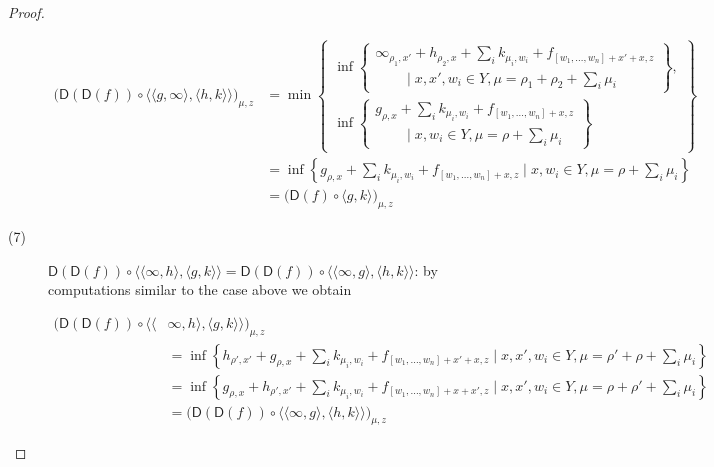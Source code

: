 \begin{proof}
\begin{description}
{
\small
\begin{align*}
\Big(\mathsf D(\mathsf D(f))\circ \langle \langle g,\infty\rangle,\langle h,k\rangle\rangle\Big)_{\mu,z}&=
\min\left\{
\begin{matrix}
\inf\left\{
\begin{matrix}
\infty_{\rho_{1},x'} + h_{\rho_{2},x}+ \sum_{i}k_{\mu_{i},w_{i}}
+
f_{[w_{1},\dots, w_{n}]+x'+x,z}\\
\qquad \mid 
x,x',w_{i}\in Y, 
\mu=\rho_{1}+\rho_{2}+\sum_{i}\mu_{i}
\end{matrix}
\right\},\\
\inf\left\{
\begin{matrix}
g_{\rho,x}+ \sum_{i}k_{\mu_{i},w_{i}}
+f_{[w_{1},\dots, w_{n}]+x,z}\\
\qquad \mid 
x,w_{i}\in Y, 
\mu=\rho+\sum_{i}\mu_{i}
\end{matrix}
\right\}
\end{matrix}
\right\}\\
&=
\inf\left\{
g_{\rho,x}+ \sum_{i}k_{\mu_{i},w_{i}}
+f_{[w_{1},\dots, w_{n}]+x,z}
\mid 
x,w_{i}\in Y, 
\mu=\rho+\sum_{i}\mu_{i}
\right\}\\
&= \Big(\mathsf D(f)\circ \langle g,k\rangle\Big)_{\mu,z}
\end{align*}
}

\item[(7)] $\mathsf D(\mathsf D(f))\circ \langle\langle \infty,h\rangle, \langle g,k\rangle\rangle= \mathsf D(\mathsf D(f))\circ \langle \langle \infty,g\rangle, \langle h,k\rangle\rangle$:
by computations similar to the case above we obtain

{
\small
\begin{align*}
\Big(\mathsf D(\mathsf D(f))\circ \langle \langle & \infty,h\rangle,\langle g,k\rangle\rangle\Big)_{\mu,z}\\
&=
\inf\left\{
h_{\rho',x'} + g_{\rho,x}+ \sum_{i}k_{\mu_{i},w_{i}}
+
f_{[w_{1},\dots, w_{n}]+x'+x,z}
\mid 
x,x',w_{i}\in Y, 
\mu=\rho'+\rho+\sum_{i}\mu_{i}
\right\}\\
&=
\inf\left\{
g_{\rho,x} + h_{\rho',x'}+ \sum_{i}k_{\mu_{i},w_{i}}
+
f_{[w_{1},\dots, w_{n}]+x+x',z}
\mid 
x,x',w_{i}\in Y, 
\mu=\rho+\rho'+\sum_{i}\mu_{i}
\right\}\\
&=
\Big(\mathsf D(\mathsf D(f))\circ \langle \langle\infty,g\rangle,\langle h,k\rangle\rangle\Big)_{\mu,z}
\end{align*}
}


\end{description}
\end{proof}
